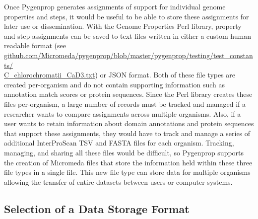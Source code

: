 Once Pygenprop generates assignments of support for individual genome properties and steps, it would be useful to be able to store these assignments for later use or dissemination. With the Genome Properties Perl library, property and step assignments can be saved to text files written in either a custom human-readable format (see \\ \href{github.com/Micromeda/pygenprop/blob/master/pygenprop/testing/test\_constants/C\_chlorochromatii\_CaD3.txt}{github.com/Micromeda/pygenprop/blob/master/pygenprop/testing/test\_constants/ \\ C\_chlorochromatii\_CaD3.txt}) or JSON format. Both of these file types are created per-organism and do not contain supporting information such as annotation match scores or protein sequences. Since the Perl library creates these files per-organism, a large number of records must be tracked and managed if a researcher wants to compare assignments across multiple organisms. Also, if a user wants to retain information about domain annotations and protein sequences that support these assignments, they would have to track and manage a series of additional InterProScan TSV and FASTA files for each organism. Tracking, managing, and sharing all these files would be difficult, so Pygenprop supports the creation of Micromeda files that store the information held within these three file types in a single file. This new file type can store data for multiple organisms allowing the transfer of entire datasets between users or computer systems.

\subsection{Selection of a Data Storage Format}

